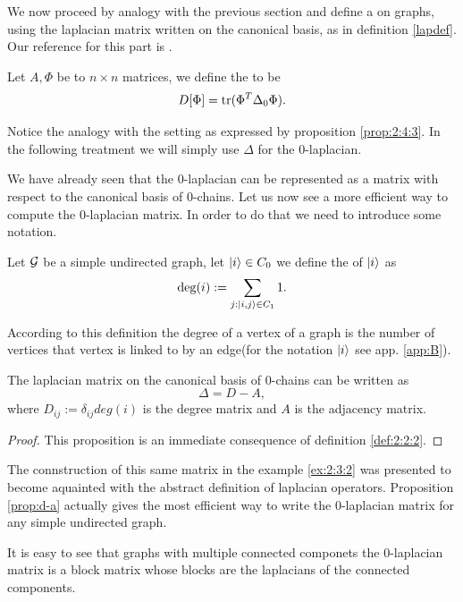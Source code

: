 \documentclass[../2.tex]{subfiles}
\begin{document}
We now proceed by analogy with the previous section and define a  on graphs, using the laplacian matrix written on the canonical basis, as
in definition \ref{lapdef}.
Our reference for this part is \cite{bronstein}.

\begin{defn}
    Let $A,\Phi$ be to $n\times n$ matrices, we define the  to be 
    \[ D[\Phi] = \operatorname{tr}(\Phi^T \Delta_0 \Phi). \]
\end{defn}

Notice the analogy with the setting as expressed by proposition \ref{prop:2:4:3}.
In the following treatment we will simply use $\Delta$ for the $0$-laplacian.

We have already seen that the $0$-laplacian can be represented as a matrix with respect to the canonical basis
of $0$-chains. Let us now see a more efficient way to compute the $0$-laplacian matrix. In order to do that we need to introduce some notation.

\begin{defn}
    Let $\mathcal{G}$ be a simple undirected graph, let $| i \rangle \in C_0$ we define the  of $| i \rangle$ as 
    \[ \operatorname{deg}(i) := \sum_{j : | i,j \rangle \in C_1} 1. \]
\end{defn}

According to this definition the degree of a vertex of a graph is the number of vertices that vertex is linked to by an edge(for the notation $| i \rangle$ see app. \ref{app:B}).

\begin{prop}
    The laplacian matrix on the canonical basis of $0$-chains can be written as
    \[ \Delta = D - A, \]
    where $D_{ij} := \delta_{ij}deg(i)$ is the degree matrix and $A$ is the adjacency matrix.
    \label{prop:d-a}
\end{prop}
\begin{proof}
    This proposition is an immediate consequence of definition \ref{def:2:2:2}. \qedhere
\end{proof}

The connstruction of this same matrix in the example \ref{ex:2:3:2} was presented to become aquainted with the abstract definition of laplacian operators.
Proposition \ref{prop:d-a} actually gives the most efficient way to write the $0$-laplacian matrix for any simple undirected graph.

It is easy to see that graphs with multiple connected componets the $0$-laplacian matrix is a block matrix whose blocks are the laplacians of the connected components.
\end{document}

